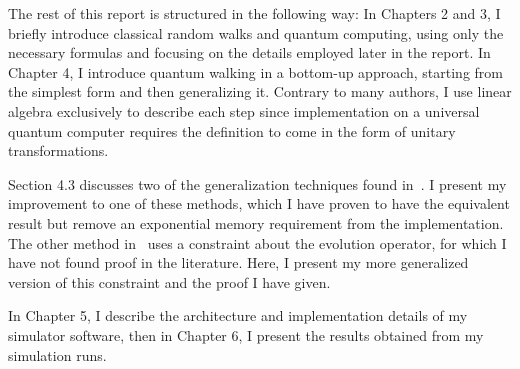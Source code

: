 The rest of this report is structured in the following way: In Chapters 2 and 3, I briefly introduce classical random walks and quantum computing, using only the necessary formulas and focusing on the details employed later in the report. In Chapter 4, I introduce quantum walking in a bottom-up approach, starting from the simplest form and then generalizing it. Contrary to many authors, I use linear algebra exclusively to describe each step since implementation on a universal quantum computer requires the definition to come in the form of unitary transformations.

Section 4.3 discusses two of the generalization techniques found in~\cite{Portugal}. I present my improvement to one of these methods, which I have proven to have the equivalent result but remove an exponential memory requirement from the implementation. The other method in~\cite{Portugal} uses a constraint about the evolution operator, for which I have not found proof in the literature. Here, I present my more generalized version of this constraint and the proof I have given.

In Chapter 5, I describe the architecture and implementation details of my simulator software, then in Chapter 6, I present the results obtained from my simulation runs.